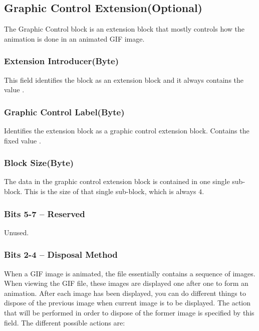 \subsection{Graphic Control Extension(Optional)}

The Graphic Control block is an extension block that mostly controls
how the animation is done in an animated GIF image.

\subsubsection{Extension Introducer(Byte)}

This field identifies the block as an extension block and it always
contains the value .

\subsubsection{Graphic Control Label(Byte)}

Identifies the extension block as a graphic control extension
block. Contains the fixed value .

\subsubsection{Block Size(Byte)}

The data in the graphic control extension block is contained in one
single sub-block. This is the size of that single sub-block, which is
always $4$.

\subsubsection{Bits 5-7 -- Reserved}

Unused.

\subsubsection{Bits 2-4 -- Disposal Method}

When a GIF image is animated, the file essentially contains a sequence
of images. When viewing the GIF file, these images are displayed one
after one to form an animation. After each image has been displayed,
you can do different things to dispose of the previous image when
current image is to be displayed. The action that will be performed in
order to dispose of the former image is specified by this field. The
different possible actions are:

